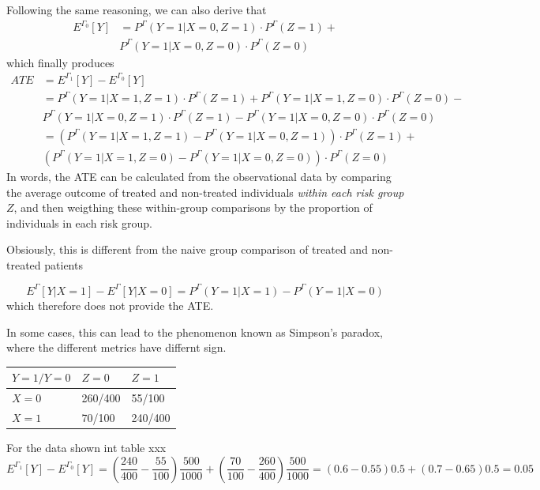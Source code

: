 \documentclass[
]{book}
\theoremstyle{definition}
\theoremstyle{definition}
\theoremstyle{definition}
\theoremstyle{remark}
\begin{document}
Following the same reasoning, we can also derive that
\begin{align*}
E^{\Gamma_0}[Y] &= P^{\Gamma}(Y = 1 | X = 0, Z = 1) \cdot P^{\Gamma}(Z = 1) + \\
                &  P^{\Gamma}(Y = 1 | X = 0, Z = 0) \cdot P^{\Gamma}(Z = 0)
\end{align*}
which finally produces
\begin{align*}
ATE &= E^{\Gamma_1}[Y] - E^{\Gamma_0}[Y] \\
    &= P^{\Gamma}(Y = 1 | X = 1, Z = 1) \cdot P^{\Gamma}(Z = 1) + P^{\Gamma}(Y = 1 | X = 1, Z = 0) \cdot P^{\Gamma}(Z = 0) - \\
    &  P^{\Gamma}(Y = 1 | X = 0, Z = 1) \cdot P^{\Gamma}(Z = 1) - P^{\Gamma}(Y = 1 | X = 0, Z = 0) \cdot P^{\Gamma}(Z = 0) \\
    &= (P^{\Gamma}(Y = 1 | X = 1, Z = 1) - P^{\Gamma}(Y = 1 | X = 0, Z = 1)) \cdot P^{\Gamma}(Z = 1) + \\
    &  (P^{\Gamma}(Y = 1 | X = 1, Z = 0) - P^{\Gamma}(Y = 1 | X = 0, Z = 0)) \cdot P^{\Gamma}(Z = 0)
\end{align*}
In words, the ATE can be calculated from the observational data by comparing the average outcome of treated and non-treated individuals \emph{within each risk group} \(Z\), and then weigthing these within-group comparisons by the proportion of individuals in each risk group.

Obsiously, this is different from the naive group comparison of treated and non-treated patients

\begin{equation}
E^{\Gamma}[Y|X = 1] - E^{\Gamma}[Y|X = 0] = P^{\Gamma}(Y = 1 | X = 1) - P^{\Gamma}(Y = 1 | X = 0)
\end{equation}
which therefore does not provide the ATE.

In some cases, this can lead to the phenomenon known as Simpson's paradox, where the different metrics have differnt sign.

\begin{longtable}[]{@{}lll@{}}
\toprule
\(Y = 1 / Y=0\) & \(Z = 0\) & \(Z = 1\)\tabularnewline
\midrule
\endhead
\(X = 0\) & 260/400 & 55/100\tabularnewline
\(X = 1\) & 70/100 & 240/400\tabularnewline
\bottomrule
\end{longtable}

For the data shown int table xxx
\begin{equation}
E^{\Gamma_1}[Y] - E^{\Gamma_0}[Y] = (\frac{240}{400} - \frac{55}{100}) \frac{500}{1000} + (\frac{70}{100} - \frac{260}{400}) \frac{500}{1000} = (0.6 - 0.55) 0.5 + (0.7 - 0.65) 0.5 = 0.05
\end{equation}
\end{document}

